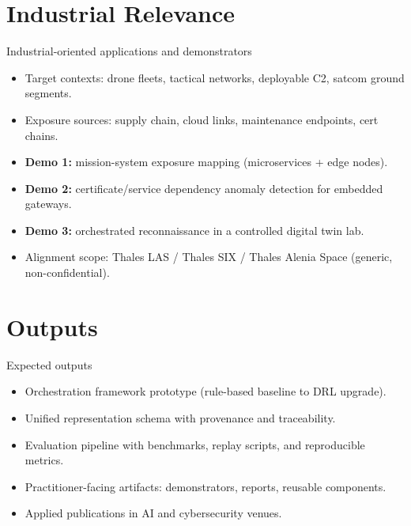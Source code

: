 \documentclass[10pt,aspectratio=169]{beamer}
\begin{document}
\section{Industrial Relevance}
\begin{frame}{Industrial-oriented applications and demonstrators}
    \begin{itemize}
        \item Target contexts: drone fleets, tactical networks, deployable C2, satcom ground segments.
        \item Exposure sources: supply chain, cloud links, maintenance endpoints, cert chains.
        \item \textbf{Demo 1:} mission-system exposure mapping (microservices + edge nodes).
        \item \textbf{Demo 2:} certificate/service dependency anomaly detection for embedded gateways.
        \item \textbf{Demo 3:} orchestrated reconnaissance in a controlled digital twin lab.
        \item Alignment scope: Thales LAS / Thales SIX / Thales Alenia Space (generic, non-confidential).
    \end{itemize}
\end{frame}

\section{Outputs}
\begin{frame}{Expected outputs}
    \begin{itemize}
        \item Orchestration framework prototype (rule-based baseline to DRL upgrade).
        \item Unified representation schema with provenance and traceability.
        \item Evaluation pipeline with benchmarks, replay scripts, and reproducible metrics.
        \item Practitioner-facing artifacts: demonstrators, reports, reusable components.
        \item Applied publications in AI and cybersecurity venues.
    \end{itemize}
\end{frame}
\end{document}
